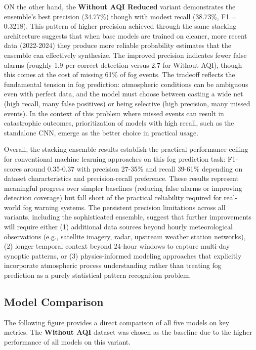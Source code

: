 \documentclass[
  letterpaper,
  DIV=11,
  numbers=noendperiod]{scrartcl}
\begin{document}
ON the other hand, the \textbf{Without AQI Reduced} variant demonstrates
the ensemble's best precision (34.77\%) though with modest recall
(38.73\%, F1 = 0.3218). This pattern of higher precision achieved
through the same stacking architecture suggests that when base models
are trained on cleaner, more recent data (2022-2024) they produce more
reliable probability estimates that the ensemble can effectively
synthesize. The improved precision indicates fewer false alarms (roughly
1.9 per correct detection versus 2.7 for Without AQI), though this comes
at the cost of missing 61\% of fog events. The tradeoff reflects the
fundamental tension in fog prediction: atmospheric conditions can be
ambiguous even with perfect data, and the model must choose between
casting a wide net (high recall, many false positives) or being
selective (high precision, many missed events). In the context of this
problem where missed events can result in catastrophic outcomes,
prioritization of models with high recall, such as the standalone CNN,
emerge as the better choice in practical usage.

Overall, the stacking ensemble results establish the practical
performance ceiling for conventional machine learning approaches on this
fog prediction task: F1-scores around 0.35-0.37 with precision 27-35\%
and recall 39-61\% depending on dataset characteristics and
precision-recall preference. These results represent meaningful progress
over simpler baselines (reducing false alarms or improving detection
coverage) but fall short of the practical reliability required for
real-world fog warning systems. The persistent precision limitations
across all variants, including the sophisticated ensemble, suggest that
further improvements will require either (1) additional data sources
beyond hourly meteorological observations (e.g., satellite imagery,
radar, upstream weather station networks), (2) longer temporal context
beyond 24-hour windows to capture multi-day synoptic patterns, or (3)
physics-informed modeling approaches that explicitly incorporate
atmospheric process understanding rather than treating fog prediction as
a purely statistical pattern recognition problem.

\subsection{Model Comparison}\label{model-comparison}

The following figure provides a direct comparison of all five models on
key metrics. The \textbf{Without AQI} dataset was chosen as the baseline
due to the higher performance of all models on this variant.
\end{document}
